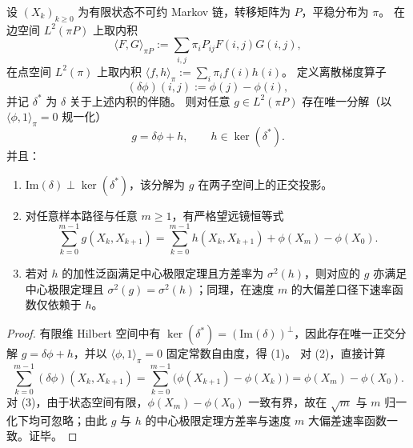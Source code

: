 \begin{theorem}\label{thm:discussion-hodge-stokes-variance-rigidity}
设 \((X_k)_{k\ge 0}\) 为有限状态不可约 Markov 链，转移矩阵为 \(P\)，平稳分布为 \(\pi\)。
在边空间 \(L^2(\pi P)\) 上取内积
\[
  \langle F,G\rangle_{\pi P}:=\sum_{i,j}\pi_iP_{ij}F(i,j)G(i,j),
\]
在点空间 \(L^2(\pi)\) 上取内积 \(\langle f,h\rangle_\pi:=\sum_i\pi_i f(i)h(i)\)。
定义离散梯度算子
\[
  (\delta\phi)(i,j):=\phi(j)-\phi(i),
\]
并记 \(\delta^\ast\) 为 \(\delta\) 关于上述内积的伴随。
则对任意 \(g\in L^2(\pi P)\) 存在唯一分解（以 \(\langle\phi,1\rangle_\pi=0\) 规一化）
\[
  g=\delta\phi+h,
  \qquad
  h\in\ker(\delta^\ast).
\]
并且：
\begin{enumerate}
  \item \(\mathrm{Im}(\delta)\perp\ker(\delta^\ast)\)，该分解为 \(g\) 在两子空间上的正交投影。
  \item 对任意样本路径与任意 \(m\ge 1\)，有严格望远镜恒等式
  \[
    \sum_{k=0}^{m-1}g(X_k,X_{k+1})
    =
    \sum_{k=0}^{m-1}h(X_k,X_{k+1})+\phi(X_m)-\phi(X_0).
  \]
  \item 若对 \(h\) 的加性泛函满足中心极限定理且方差率为 \(\sigma^2(h)\)，则对应的 \(g\) 亦满足中心极限定理且 \(\sigma^2(g)=\sigma^2(h)\)；同理，在速度 \(m\) 的大偏差口径下速率函数仅依赖于 \(h\)。
\end{enumerate}
\end{theorem}

\begin{proof}
有限维 Hilbert 空间中有 \(\ker(\delta^\ast)=(\mathrm{Im}(\delta))^\perp\)，因此存在唯一正交分解 \(g=\delta\phi+h\)，并以 \(\langle\phi,1\rangle_\pi=0\) 固定常数自由度，得 (1)。
对 (2)，直接计算
\[
  \sum_{k=0}^{m-1}(\delta\phi)(X_k,X_{k+1})
  =\sum_{k=0}^{m-1}\bigl(\phi(X_{k+1})-\phi(X_k)\bigr)
  =\phi(X_m)-\phi(X_0).
\]
对 (3)，由于状态空间有限，\(\phi(X_m)-\phi(X_0)\) 一致有界，故在 \(\sqrt m\) 与 \(m\) 归一化下均可忽略；由此 \(g\) 与 \(h\) 的中心极限定理方差率与速度 \(m\) 大偏差速率函数一致。证毕。
\end{proof}


